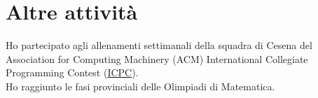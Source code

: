 \documentclass[curriculum-vitae-ita]{subfiles}
\begin{document}
	\section*{Altre attività}
		 Ho partecipato agli allenamenti settimanali della squadra di Cesena del Association for Computing Machinery (ACM) International Collegiate Programming Contest (\href{https://icpc.global}{ICPC}).\\

		 Ho raggiunto le fasi provinciali delle Olimpiadi di Matematica.
	
\end{document}
